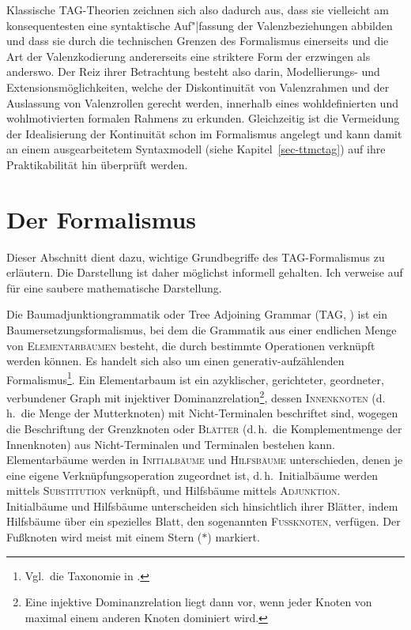 Klassische TAG-Theorien zeichnen sich also dadurch aus, dass sie vielleicht am konsequentesten eine syntaktische Auf"|fassung der Valenzbeziehungen abbilden und dass sie durch die technischen Grenzen des Formalismus einerseits und die Art der Valenzkodierung andererseits eine striktere Form der  erzwingen als anderswo. Der Reiz ihrer Betrachtung besteht also darin, Modellierungs- und Extensionsmöglichkeiten, welche der Diskontinuität von Valenzrahmen und der Auslassung von Valenzrollen gerecht werden, innerhalb eines wohldefinierten und wohlmotivierten formalen Rahmens zu erkunden. Gleichzeitig ist die Vermeidung der Idealisierung der Kontinuität schon im Formalismus angelegt und kann damit an einem ausgearbeitetem Syntaxmodell (siehe Kapitel~\ref{sec-ttmctag}) auf ihre Praktikabilität hin überprüft werden.  


\section{Der Formalismus} \label{sec-tag-formalismus}

Dieser Abschnitt dient dazu, wichtige Grundbegriffe des TAG-Formalismus zu erläutern. Die Darstellung ist daher möglichst informell gehalten. Ich verweise auf \cite{Kallmeyer:09} für eine saubere mathematische Darstellung.  

Die Baumadjunktiongrammatik oder Tree Adjoining Grammar (TAG, \citealt{Joshi:etal:75,Joshi:Schabes:97}) ist ein Baumersetzungsformalismus, bei dem die Grammatik aus einer endlichen Menge von \textsc{Elementarbäumen} besteht, die durch bestimmte Operationen verknüpft werden können. Es handelt sich also um einen generativ-aufzählenden Formalismus\footnote{Vgl.\ die Taxonomie in \cite{Pullum:Scholz:01}.}. Ein Elementarbaum ist ein azyklischer, gerichteter, geordneter, verbundener Graph mit injektiver Dominanzrelation\footnote{Eine injektive Dominanzrelation liegt dann vor, wenn jeder Knoten von maximal einem anderen Knoten dominiert wird.}, dessen \textsc{Innenknoten} (d.\,h.\ die Menge der Mutterknoten) mit Nicht-Terminalen beschriftet sind, wogegen die Beschriftung der Grenzknoten oder \textsc{Blätter} (d.\,h.\ die Komplementmenge der Innenknoten) aus Nicht-Terminalen und Terminalen bestehen kann. Elementarbäume werden in \textsc{Initialbäume} und \textsc{Hilfsbäume} unterschieden, denen je eine eigene Verknüpfungsoperation zugeordnet ist, d.\,h.\ Initialbäume werden mittels \textsc{ Substitution} verknüpft, und Hilfsbäume mittels \textsc{Adjunktion}. Initialbäume und Hilfsbäume unterscheiden sich hinsichtlich ihrer Blätter, indem Hilfsbäume über ein spezielles Blatt, den sogenannten \textsc{Fu\ss knoten}, verfügen. Der Fu\ss knoten wird meist mit einem Stern ($\ast$) markiert.  

